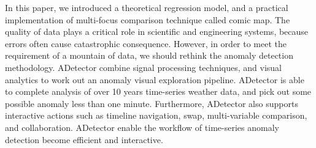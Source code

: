 \documentclass{vgtc}                          %
\begin{document}
In this paper, we introduced a theoretical regression model, and a practical implementation of multi-focus comparison technique called comic map. The quality of data plays a critical role in scientific and engineering systems, because errors often cause catastrophic consequence. However, in order to meet the requirement of a mountain of data, we should rethink the anomaly detection methodology. ADetector combine signal processing techniques, and visual analytics to work out an anomaly visual exploration pipeline. ADetector is able to complete analysis of over 10 years time-series weather data, and pick out some possible anomaly less than one minute. Furthermore, ADetector also supports interactive actions such as timeline navigation, swap, multi-variable comparison, and collaboration. ADetector enable the workflow of time-series anomaly detection become efficient and interactive.




\end{document}
